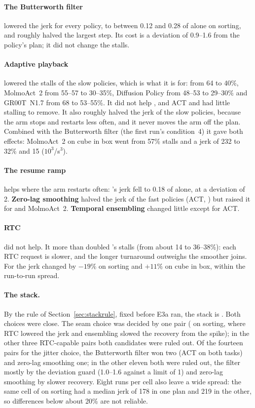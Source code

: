 \paragraph{The Butterworth filter} lowered the jerk for every policy, to between 0.12 and 0.28 of \drtc{} alone on
sorting, and roughly halved the largest step. Its cost is a deviation of 0.9--1.6\degree{} from the policy's plan; it
did not change the stalls.

\paragraph{Adaptive playback} lowered the stalls of the slow policies, which is what it is for: \groot{} from 64 to
40\%, MolmoAct~2 from 55--57 to 30--35\%, Diffusion Policy from 48--53 to 29--30\% and GR00T~N1.7 from 68 to
53--55\%. It did not help \pizerofive, and ACT and \smolvla{} had little stalling to remove. It also roughly halved
the jerk of the slow policies, because the arm stops and restarts less often, and it never moves the arm off the plan.
Combined with the Butterworth filter (the first run's condition~4) it gave both effects: MolmoAct~2 on cube in box went
from 57\% stalls and a jerk of 232 to 32\% and 15 ($10^3$\degree/s$^3$).

\paragraph{The resume ramp} helps where the arm restarts often: \groot's jerk fell to 0.18 of \drtc{} alone, at a
deviation of 2\degree. \textbf{Zero-lag smoothing} halved the jerk of the fast policies (ACT, \smolvla) but raised it
for \groot{} and MolmoAct~2. \textbf{Temporal ensembling} changed little except for ACT.

\paragraph{RTC} did not help. It more than doubled \smolvla's stalls (from about 14 to 36--38\%): each RTC request
is slower, and the longer turnaround outweighs the smoother joins. For \groot{} the jerk changed by $-19\%$ on sorting
and $+11\%$ on cube in box, within the run-to-run spread.

\paragraph{The stack.} By the rule of Section~\ref{sec:stackrule}, fixed before E3a ran, the stack is .
Both choices were close. The seam choice was decided by one pair (\groot{} on sorting, where RTC lowered the jerk and
ensembling slowed the recovery from the spike); in the other three RTC-capable pairs both candidates were ruled out.
Of the fourteen pairs for the jitter choice, the Butterworth filter won two (ACT on both tasks) and zero-lag smoothing
one; in the other eleven both were ruled out, the filter mostly by the deviation guard (1.0--1.6\degree{} against a
limit of 1\degree) and zero-lag smoothing by slower recovery. Eight runs per cell also leave a wide spread: the same
\drtc{} cell of \groot{} on sorting had a median jerk of 178 in one plan and 219 in the other, so differences below
about 20\% are not reliable.

